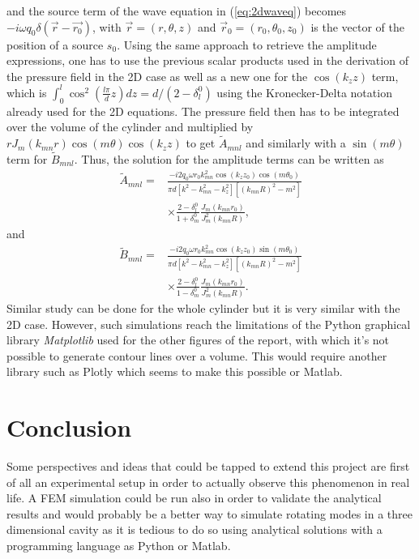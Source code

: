 \documentclass[%
 reprint,
 amsmath,amssymb,
 aps,
]{revtex4-2}
\begin{document}
and the source term of the wave equation in (\ref{eq:2dwaveq}) becomes $-i\omega q_0 \delta(\vec{r} - \vec{r_0})$, with $\vec{r} = (r, \theta, z)$ and $\vec{r}_0 = (r_0, \theta_0, z_0)$ is the vector of the position of a source $s_0$. Using the same approach to retrieve the amplitude expressions, one has to use the previous scalar products used in the derivation of the pressure field in the 2D case as well as a new one for the $\cos(k_z z)$ term, which is $\int_0^l \cos^2\left( \frac{l \pi}{d}z \right) dz = d/(2 - \delta_l^0)$ using the Kronecker-Delta notation already used for the 2D equations. The pressure field then has to be integrated over the volume of the cylinder and multiplied by $r J_m(k_{mn}r) \cos(m\theta) \cos(k_z z)$ to get $\tilde{A}_{mnl}$ and similarly with a $\sin(m\theta)$ term for $\tilde{B}_{mnl}$. Thus, the solution for the amplitude terms can be written as 
\begin{equation}
    \begin{split}
        \tilde{A}_{mnl} = &\frac{- i 2 q_0 \omega r_0 k^2_{mn} \cos(k_z z_0) \cos(m \theta_0)}{\pi d\left[k^2 - k^2_{mn} - k^2_z \right] \left[(k_{mn}R)^2 - m^2 \right]}\\  &\times \frac{2 - \delta_l^0}{1 + \delta_m^0} \frac{J_m(k_{mn}r_0)}{J^2_{m}(k_{mn}R)},
    \end{split}
\end{equation}
and
\begin{equation}
    \begin{split}
        \tilde{B}_{mnl} = &\frac{- i 2 q_0 \omega r_0 k^2_{mn} \cos(k_z z_0) \sin(m \theta_0)}{\pi d\left[k^2 - k^2_{mn} - k^2_z \right] \left[(k_{mn}R)^2 - m^2 \right]}\\  &\times \frac{2 - \delta_l^0}{1 - \delta_m^0} \frac{J_m(k_{mn}r_0)}{J^2_{m}(k_{mn}R)}.
    \end{split}
\end{equation}
Similar study can be done for the whole cylinder but it is very similar with the 2D case. However, such simulations reach the limitations of the Python graphical library \emph{Matplotlib} used for the other figures of the report, with which it's not possible to generate contour lines over a volume. This would require another library such as Plotly which seems to make this possible or Matlab.

\section{Conclusion}
Some perspectives and ideas that could be tapped to extend this project are first of all an experimental setup in order to actually observe this phenomenon in real life. A FEM simulation could be run also in order to validate the analytical results and would probably be a better way to simulate rotating modes in a three dimensional cavity as it is tedious to do so using analytical solutions with a programming language as Python or Matlab.
\end{document}
